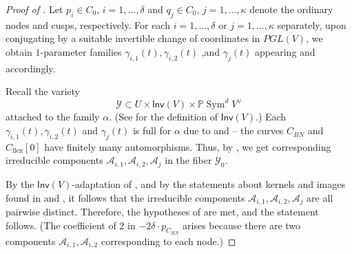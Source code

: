 \documentclass[12 pt, reqno]{amsart}
\theoremstyle{definition}
\newcommand{\on}{\operatorname}
\newcommand{\mb}{\mathbb}
\renewcommand{\P}{\mb{P}}
\renewcommand{\k}{\mathbb{C}}
\begin{document}
\begin{proof}[Proof of ]

Let $p_{i} \in C_0$, $i=1, \dots, \delta$ and $q_{j} \in C_0$,
$j=1, \dots, \kappa$ denote the ordinary nodes and cusps,
respectively.  For each $i = 1, \dots, \delta$ or
$j = 1, \dots, \kappa$ separately, upon conjugating by a suitable
invertible change of coordinates in $PGL(V)$, we obtain $1$-parameter
families $\gamma_{i,1}(t), \gamma_{i,2}(t)$ ,and $\gamma_{j}(t)$
appearing  and  accordingly.

Recall the variety
\[\mathcal{Y} \subset U \times \mathsf{Inv}(V) \times \P
  \on{Sym}^{d}V^{\vee}\] attached to the family $\alpha$. (See
 for the definition of $\mathsf{Inv}(V)$.)  Each
$\gamma_{i,1}(t), \gamma_{i,2}(t)$ and $\gamma_{j}(t)$ is full for
$\alpha$ due to  and  -- the curves
$C_{BN}$ and $C_{\on{flex}}[0]$ have finitely many
automorphisms. Thus, by , we get corresponding
irreducible components
$\mathcal{A}_{i,1}, \mathcal{A}_{i,2}, \mathcal{A}_{j}$ in the fiber
$\mathcal{Y}_0$.

By the $\mathsf{Inv}(V)$-adaptation of , and by the
statements about kernels and images found in 
and , it follows that the irreducible components
$\mathcal{A}_{i,1}, \mathcal{A}_{i,2}, \mathcal{A}_{j}$ are all
pairwise distinct.  Therefore, the hypotheses of  are
met, and the statement follows.  (The coefficient of $2$ in
$-2 \delta \cdot p_{C_{BN}}$ arises because there are two components
$\mathcal{A}_{i,1}, \mathcal{A}_{i,2}$ corresponding to each node.)



\end{proof}
\end{document}
